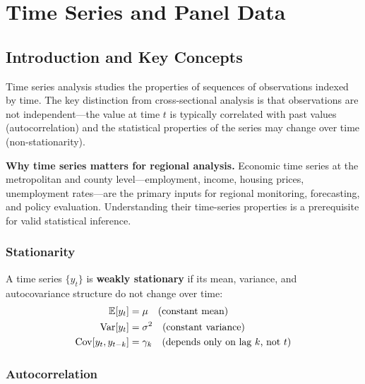 
\chapter{Time Series and Panel Data}
\label{chap_TimeSeries}

\section{Introduction and Key Concepts}
\label{sec_TSIntro}

Time series analysis studies the properties of sequences of observations
indexed by time. The key distinction from cross-sectional analysis is that
observations are not independent---the value at time $t$ is typically
correlated with past values (autocorrelation) and the statistical properties
of the series may change over time (non-stationarity).

\noindent\textbf{Why time series matters for regional analysis.}
Economic time series at the metropolitan and county level---employment,
income, housing prices, unemployment rates---are the primary inputs for
regional monitoring, forecasting, and policy evaluation. Understanding their
time-series properties is a prerequisite for valid statistical inference.

\subsection{Stationarity}

A time series $\{y_t\}$ is \textbf{weakly stationary}
if its mean, variance, and autocovariance structure do not change over time:
\begin{align}
  \mathbb{E}[y_t] &= \mu \quad\text{(constant mean)} \\
  \operatorname{Var}[y_t] &= \sigma^2 \quad\text{(constant variance)} \\
  \operatorname{Cov}[y_t, y_{t-k}] &= \gamma_k \quad\text{(depends only on lag }k\text{, not }t\text{)}
\end{align}

\subsection{Autocorrelation}

